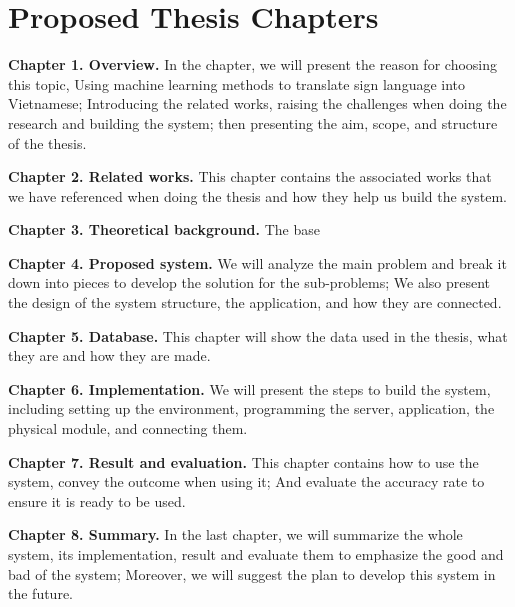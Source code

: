 \chapter{Proposed Thesis Chapters}

\textbf{Chapter 1. Overview.} In the chapter, we will present the reason for choosing this topic, Using machine learning methods to translate sign language into Vietnamese; Introducing the related works, raising the challenges when doing the research and building the system; then presenting the aim, scope, and structure of the thesis.

\textbf{Chapter 2. Related works.} This chapter contains the associated works that we have referenced when doing the thesis and how they help us build the system.

\textbf{Chapter 3. Theoretical background.} The base 

\textbf{Chapter 4. Proposed system.} We will analyze the main problem and break it down into pieces to develop the solution for the sub-problems; We also present the design of the system structure, the application, and how they are connected.

\textbf{Chapter 5. Database.} This chapter will show the data used in the thesis, what they are and how they are made.

\textbf{Chapter 6. Implementation.} We will present the steps to build the system, including setting up the environment, programming the server, application, the physical module, and connecting them.

\textbf{Chapter 7. Result and evaluation.} This chapter contains how to use the system, convey the outcome when using it; And evaluate the accuracy rate to ensure it is ready to be used.

\textbf{Chapter 8. Summary.} In the last chapter, we will summarize the whole system, its implementation, result and evaluate them to emphasize the good and bad of the system; Moreover, we will suggest the plan to develop this system in the future.
